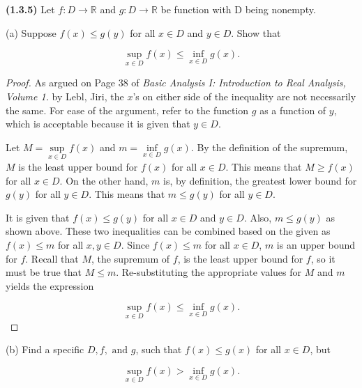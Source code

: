 \documentclass[12pt]{article}
\newcommand{\bR}{{\mathbb{R}}}
\begin{document}
\newpage

\noindent \textbf{(1.3.5)} Let $f : D\to \bR$ and $g : D\to \bR$ be function with D being nonempty. \newline

\noindent (a) Suppose $f(x)\le g(y)$ for all $x\in D$ and $y\in D$. Show that

\begin{equation*}
	\underset{x\in D}{\sup} f(x) \le \underset{x\in D}{\inf} g(x).
\end{equation*} 

\begin{proof}
	As argued on Page 38 of \textit{Basic Analysis I: Introduction to Real Analysis, Volume 1.} by Lebl, Jiri, the $x$'s on either side of the inequality are not necessarily the same. For ease of the argument, refer to the function $g$ as a function of $y$, which is acceptable because it is given that $y\in D$. 
	
\indent Let $M=\underset{x\in D}{\sup} f(x)$ and $m=\underset{x\in D}{\inf} g(x)$. By the definition of the supremum, $M$ is the least upper bound for $f(x)$ for all $x\in D$. This means that $M\ge f(x)$ for all $x\in D$. On the other hand, $m$ is, by definition, the greatest lower bound for $g(y)$ for all $y\in D$. This means that $m\le g(y)$ for all $y\in D$.

\indent It is given that $f(x)\le g(y)$ for all $x\in D$ and $y\in D$. Also, $m\le g(y)$ as shown above. These two inequalities can be combined based on the given as $f(x)\le m$ for all $x,y\in D$. Since $f(x)\le m$ for all $x\in D$, $m$ is an upper bound for $f$. Recall that $M$, the supremum of $f$, is the least upper bound for $f$, so it must be true that $M\le m$. Re-substituting the appropriate values for $M$ and $m$ yields the expression 

\begin{equation*}
	\underset{x\in D}{\sup} f(x) \le \underset{x\in D}{\inf} g(x).
\end{equation*}

\end{proof}

\newpage

\noindent (b) Find a specific $D, f, \text{ and } g$, such that $f(x) \le g(x)$ for all $x\in D$, but

\begin{equation*}
	\underset{x\in D}{\sup} f(x) > \underset{x\in D}{\inf} g(x).
\end{equation*}
\end{document}

